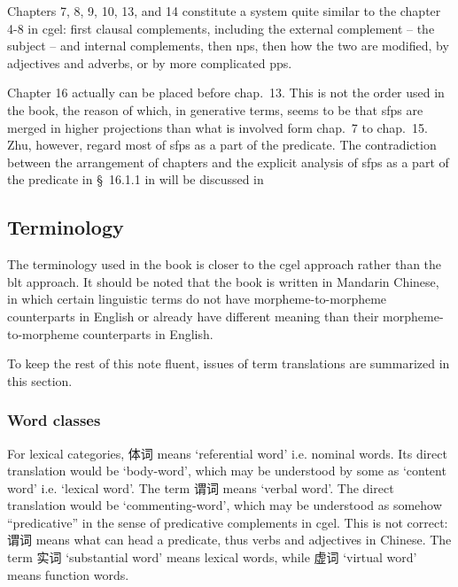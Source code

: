 \documentclass[UTF8, a4paper, oneside, scheme=plain]{ctexart}
\newcommand*{\citesec}[1]{\S~{#1}}
\newcommand*{\citechap}[1]{chap.~{#1}}
\newcommand{\translate}[1]{`#1'}
\begin{document}
Chapters 7, 8, 9, 10, 13, and 14 constitute a system 
quite similar to the chapter 4-8 in \ac{cgel}:
first clausal complements, 
including the external complement -- the subject --
and internal complements,
then \ac{np}s,
then how the two are modified,
by adjectives and adverbs,
or by more complicated \acs{pp}s.

Chapter 16 actually can be placed before \citechap{13}.
This is not the order used in the book,
the reason of which, in generative terms,
seems to be that \ac{sfp}s are merged in higher projections than what is involved 
form \citechap{7} to \citechap{15}.
Zhu, however, regard most of \ac{sfp}s as a part of the predicate.
The contradiction between the arrangement of chapters 
and the explicit analysis of \ac{sfp}s as a part of the predicate in \citesec{16.1.1} 
in \citet{zhudexigrammar} 
will be discussed in %

\subsection{Terminology}\label{sec:terminology}

The terminology used in the book is closer to the \ac{cgel} approach rather than the \ac{blt} approach.
It should be noted that the book is written in Mandarin Chinese,
in which certain linguistic terms 
do not have morpheme-to-morpheme counterparts in English or
already have different meaning than their morpheme-to-morpheme counterparts in English.

To keep the rest of this note fluent,
issues of term translations are summarized in this section.

\subsubsection{Word classes}\label{sec:word-class-term}

For lexical categories, 体词 means \translate{referential word} i.e. nominal words.
Its direct translation would be \translate{body-word},
which may be understood by some as \translate{content word} i.e. \translate{lexical word}.
The term 谓词 means \translate{verbal word}.
The direct translation would be \translate{commenting-word},
which may be understood as somehow ``predicative'' in the sense of predicative complements in \ac{cgel}.
This is not correct: 
谓词 means what can head a predicate,
thus verbs and adjectives in Chinese.
The term 实词 \translate{substantial word} means lexical words,
while 虚词 \translate{virtual word} means function words.
\end{document}
